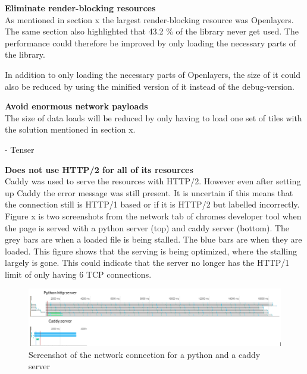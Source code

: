\textbf{Eliminate render-blocking resources}\\
As mentioned in section x the largest render-blocking resource was Openlayers. The same section also highlighted that 43.2 \% of the library never get used. The performance could therefore be improved by only loading the necessary parts of the library. 

In addition to only loading the necessary parts of Openlayers, the size of it could also be reduced by using the minified version of it instead of the debug-version.
\citep{OlModule}

\textbf{Avoid enormous network payloads}\\
The size of data loads will be reduced by only having to load one set of tiles with the solution mentioned in section x. 

-	Tenser 
 

\textbf{Does not use HTTP/2 for all of its resources}\\
Caddy was used to serve the resources with HTTP/2. However even after setting up Caddy the error message was still present. It is uncertain if this means that the connection still is HTTP/1 based or if it is HTTP/2 but labelled incorrectly. Figure x is two screenshots from the network tab of chromes developer tool when the page is served with a python server (top) and caddy server (bottom). 
The grey bars are when a loaded file is being stalled. The blue bars are when they are loaded. This figure shows that the serving is being optimized, where the stalling largely is gone. This could indicate that the server no longer has the HTTP/1 limit of only having 6 TCP connections.

\begin{figure} [H]
	\centering
	\includegraphics[width=.8\textwidth]{Pictures/CaddyVsPython}
	\caption{Screenshot of the network connection for a python and a caddy server}
	\label{CaddyVsPython}
\end{figure}


 


